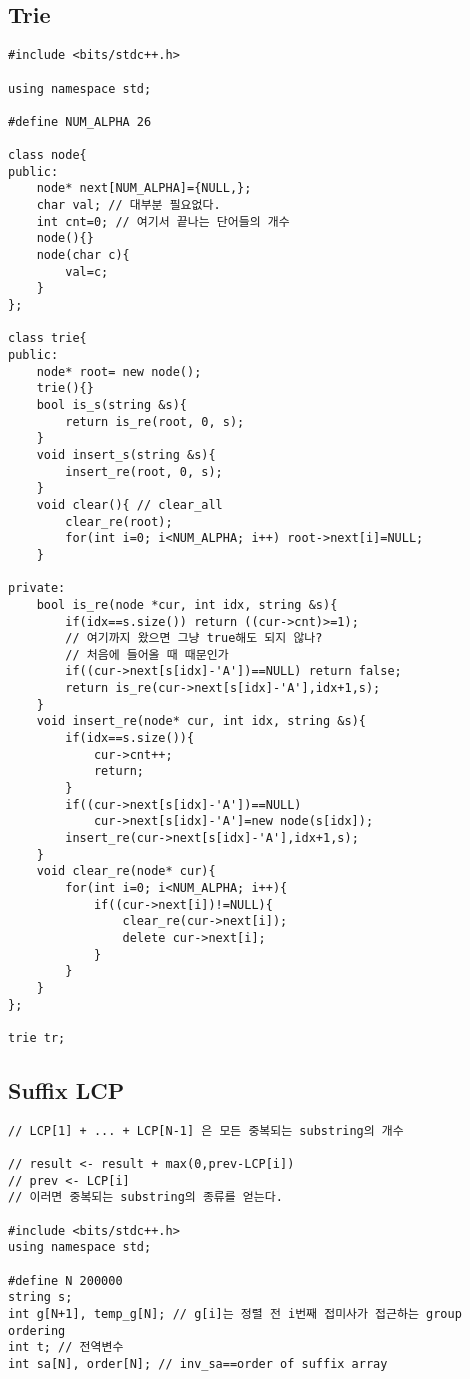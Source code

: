 \documentclass[10pt, landscape]{article}
\begin{document}
\begin{multicols}{2}
\subsection{Trie}
\begin{verbatim}
#include <bits/stdc++.h>

using namespace std;

#define NUM_ALPHA 26

class node{
public:
    node* next[NUM_ALPHA]={NULL,};
    char val; // 대부분 필요없다.
    int cnt=0; // 여기서 끝나는 단어들의 개수
    node(){}
    node(char c){
        val=c; 
    }
};

class trie{
public:
    node* root= new node();
    trie(){}
    bool is_s(string &s){
        return is_re(root, 0, s);
    }
    void insert_s(string &s){
        insert_re(root, 0, s);
    }
    void clear(){ // clear_all
        clear_re(root);
        for(int i=0; i<NUM_ALPHA; i++) root->next[i]=NULL;
    }

private: 
    bool is_re(node *cur, int idx, string &s){
        if(idx==s.size()) return ((cur->cnt)>=1); 
        // 여기까지 왔으면 그냥 true해도 되지 않나? 
        // 처음에 들어올 때 때문인가
        if((cur->next[s[idx]-'A'])==NULL) return false;
        return is_re(cur->next[s[idx]-'A'],idx+1,s);
    }
    void insert_re(node* cur, int idx, string &s){
        if(idx==s.size()){
            cur->cnt++;
            return;
        }
        if((cur->next[s[idx]-'A'])==NULL) 
            cur->next[s[idx]-'A']=new node(s[idx]);
        insert_re(cur->next[s[idx]-'A'],idx+1,s);
    }
    void clear_re(node* cur){
        for(int i=0; i<NUM_ALPHA; i++){
            if((cur->next[i])!=NULL){
                clear_re(cur->next[i]);
                delete cur->next[i];
            }
        }
    }
};

trie tr;
\end{verbatim}

\subsection{Suffix LCP}
\begin{verbatim}
// LCP[1] + ... + LCP[N-1] 은 모든 중복되는 substring의 개수

// result <- result + max(0,prev-LCP[i])
// prev <- LCP[i]
// 이러면 중복되는 substring의 종류를 얻는다.

#include <bits/stdc++.h>
using namespace std;

#define N 200000
string s;
int g[N+1], temp_g[N]; // g[i]는 정렬 전 i번째 접미사가 접근하는 group ordering
int t; // 전역변수
int sa[N], order[N]; // inv_sa==order of suffix array


\end{verbatim}
\end{multicols}
\end{document}
